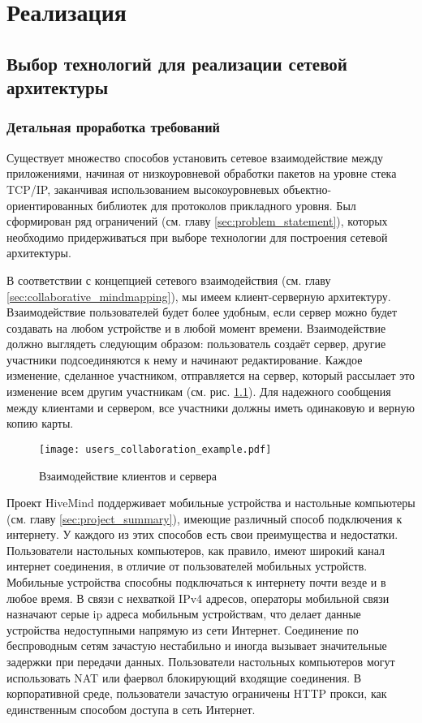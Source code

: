 \newpage

\chapter{Реализация}
\label{ch:chapter_2}

\section{Выбор технологий для реализации сетевой архитектуры}

\subsection{Детальная проработка требований}
\label{sec:detailed_requirements}
Существует множество способов установить сетевое взаимодействие между
приложениями, начиная от низкоуровневой обработки пакетов на уровне стека
TCP/IP, заканчивая использованием высокоуровневых объектно-ориентированных
библиотек для протоколов прикладного уровня. Был сформирован ряд ограничений
(см. главу \ref{sec:problem_statement}), которых необходимо придерживаться при
выборе технологии для построения сетевой архитектуры.

В соответствии с концепцией сетевого взаимодействия (см. главу
\ref{sec:collaborative_mindmapping}), мы имеем клиент-серверную архитектуру.
Взаимодействие пользователей будет более удобным, если сервер можно будет
создавать на любом устройстве и в любой момент времени. Взаимодействие должно
выглядеть следующим образом: пользователь создаёт сервер, другие участники
подсоединяются к нему и начинают редактирование. Каждое изменение, сделанное
участником, отправляется на сервер, который рассылает это изменение всем другим
участникам (см. рис. \ref{img:users_collaboration_example}). Для надежного
сообщения между клиентами и сервером, все участники должны иметь одинаковую и верную копию карты.

\begin{figure}[!h]
  \centering
  \texttt{[image: users\_collaboration\_example.pdf]}
  \caption{Взаимодействие клиентов и сервера}
  \label{img:users_collaboration_example}
\end{figure} 

Проект HiveMind поддерживает мобильные устройства и настольные компьютеры (см.
главу \ref{sec:project_summary}), имеющие различный способ подключения к
интернету. У каждого из этих способов есть свои преимущества и
недостатки. Пользователи настольных компьютеров, как правило, имеют широкий
канал интернет соединения, в отличие от пользователей мобильных устройств.
Мобильные устройства способны подключаться к интернету почти везде и в любое
время. В связи с нехваткой IPv4 адресов, операторы мобильной связи назначают
серые ip адреса мобильным устройствам, что делает данные устройства недоступными
напрямую из сети Интернет. Соединение по беспроводным сетям зачастую нестабильно
и иногда вызывает значительные задержки при передачи данных. Пользователи
настольных компьютеров могут использовать NAT или фаервол блокирующий
входящие соединения. В корпоративной среде, пользователи зачастую ограничены
HTTP прокси, как единственным способом доступа в сеть Интернет.

